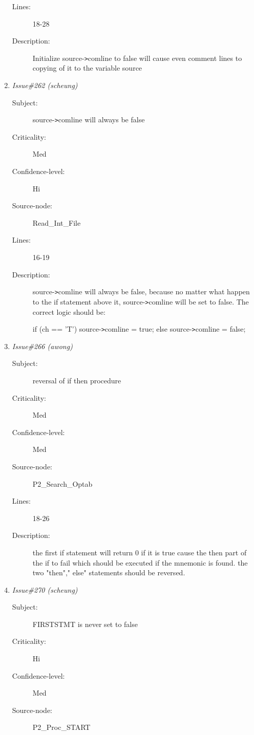 \begin{enumerate}
\begin{description}
\item [Lines:] 18-28

\item [Description:] Initialize source-{\tt >}comline to false will cause
even comment lines to copying of it to the variable source
\end{description}
\item {\it Issue\#262 (scheung)}
\begin{description}
\item [Subject:] source-{\tt >}comline will always be false
\item [Criticality:] Med
\item [Confidence-level:] Hi
\item [Source-node:] Read\_Int\_File

\item [Lines:] 16-19

\item [Description:] source-{\tt >}comline will always be false, because
no matter what happen to the if statement above it, source-{\tt >}comline will be
set to false.  The correct logic should be:

	if (ch == 'T')
		source-{\tt >}comline = true;
	else
		source-{\tt >}comline = false;
\end{description}
\item {\it Issue\#266 (awong)}
\begin{description}
\item [Subject:] reversal of if then procedure
\item [Criticality:] Med
\item [Confidence-level:] Med
\item [Source-node:] P2\_Search\_Optab

\item [Lines:] 18-26

\item [Description:] the first if statement will return 0 if it is
true cause the then part of the if to fail which should be executed if the
mnemonic is found.  the two "then"," else" statements should be reversed.
\end{description}
\item {\it Issue\#270 (scheung)}
\begin{description}
\item [Subject:] FIRSTSTMT is never set to false
\item [Criticality:] Hi
\item [Confidence-level:] Med
\item [Source-node:] P2\_Proc\_START


\end{description}
\end{enumerate}
